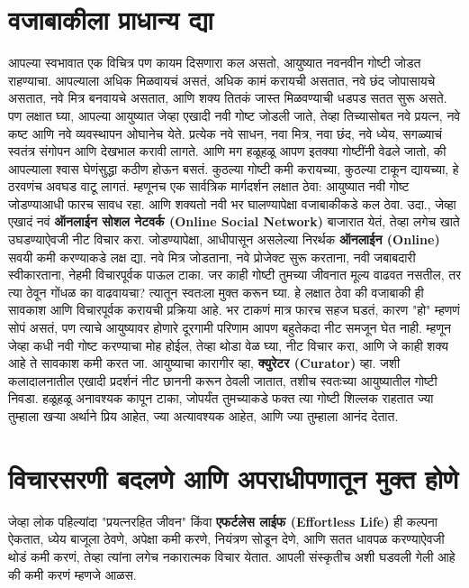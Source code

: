  \chapter{वजाबाकीला प्राधान्य द्या}
आपल्या स्वभावात एक विचित्र पण कायम दिसणारा कल असतो, आयुष्यात नवनवीन गोष्टी जोडत राहण्याचा.
 आपल्याला अधिक मिळवायचं असतं, अधिक कामं करायची असतात, नवे छंद जोपासायचे असतात, नवे मित्र बनवायचे असतात, आणि शक्य तितकं जास्त मिळवण्याची धडपड सतत सुरू असते.
पण लक्षात घ्या, आपल्या आयुष्यात जेव्हा एखादी नवी गोष्ट जोडली जाते, तेव्हा तिच्यासोबत नवे प्रयत्न, नवे कष्ट आणि नवे व्यवस्थापन ओघानेच येते. प्रत्येक नवे साधन, नवा मित्र, नवा छंद, नवे ध्येय,  सगळ्याचं स्वतंत्र संगोपन आणि देखभाल करावी लागते. आणि मग हळूहळू आपण इतक्या गोष्टींनी वेढले जातो, की आपल्याला श्वास घेणंसुद्धा कठीण होऊन बसतं. कुठल्या गोष्टी कमी करायच्या, कुठल्या टाकून द्यायच्या, हे ठरवणंच अवघड वाटू लागतं.
म्हणूनच एक सार्वत्रिक मार्गदर्शन लक्षात ठेवा: आयुष्यात नवी गोष्ट जोडण्याआधी फारच सावध रहा. आणि शक्यतो नवी भर घालण्यापेक्षा वजाबाकीकडे कल ठेवा.
उदा., जेव्हा एखादं नवं \textbf{ऑनलाईन सोशल नेटवर्क (Online Social Network)} बाजारात येतं, तेव्हा लगेच खाते उघडण्याऐवजी नीट विचार करा. जोडण्यापेक्षा, आधीपासून असलेल्या निरर्थक \textbf{ऑनलाईन (Online)} सवयी कमी करण्याकडे लक्ष द्या.
नवे मित्र जोडताना, नवे प्रोजेक्ट सुरू करताना, नवी जबाबदारी स्वीकारताना,  नेहमी विचारपूर्वक पाऊल टाका.
 जर काही गोष्टी तुमच्या जीवनात मूल्य वाढवत नसतील, तर त्या ठेवून गोंधळ का वाढवायचा? त्यातून स्वतःला मुक्त करून घ्या.
हे लक्षात ठेवा की वजाबाकी ही सावकाश आणि विचारपूर्वक करायची प्रक्रिया आहे. भर टाकणं मात्र फारच सहज घडतं,  कारण "हो" म्हणणं सोपं असतं, पण त्याचे आयुष्यावर होणारे दूरगामी परिणाम आपण बहुतेकदा नीट समजून घेत नाही. म्हणून जेव्हा कधी नवी गोष्ट करण्याचा मोह होईल, तेव्हा थोडा वेळ घ्या, नीट विचार करा, आणि जे काही शक्य आहे ते सावकाश कमी करत जा.
आयुष्याचा कारागीर व्हा, \textbf{क्युरेटर (Curator)} व्हा. जशी कलादालनातील एखादी प्रदर्शनं नीट छाननी करून ठेवली जातात, तशीच स्वतःच्या आयुष्यातील गोष्टी निवडा. हळूहळू अनावश्यक कापून टाका, जोपर्यंत तुमच्याकडे फक्त त्या गोष्टी शिल्लक राहतात ज्या तुम्हाला खऱ्या अर्थाने प्रिय आहेत, ज्या अत्यावश्यक आहेत, आणि ज्या तुम्हाला आनंद देतात.
 \chapter{विचारसरणी बदलणे आणि अपराधीपणातून मुक्त होणे}
जेव्हा लोक पहिल्यांदा "प्रयत्नरहित जीवन" किंवा \textbf{एफर्टलेस लाईफ (Effortless Life)} ही कल्पना ऐकतात, 
 ध्येय बाजूला ठेवणे, अपेक्षा कमी करणे, नियंत्रण सोडून देणे, आणि सतत धावपळ करण्याऐवजी थोडं कमी करणं, 
 तेव्हा त्यांना लगेच नकारात्मक विचार येतात. आपली संस्कृतीच अशी घडवली गेली आहे की कमी करणं म्हणजे आळस.

